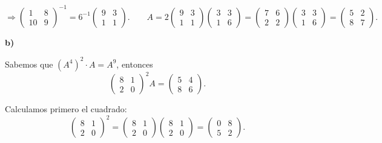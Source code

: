 \documentclass[a4paper,12pt]{article}
\begin{document}
\begin{ejercicio}[title=Ejercicio 22]
\[\Rightarrow
\begin{pmatrix}1 & 8\\ 10 & 9\end{pmatrix}^{-1} = 6^{-1} 
\begin{pmatrix}9 & 3\\ 1 & 1\end{pmatrix}.
\qquad
A = 2 
\begin{pmatrix}9 & 3\\ 1 & 1\end{pmatrix}
\begin{pmatrix}3 & 3\\ 1 & 6\end{pmatrix}
=
\begin{pmatrix}7 & 6\\ 2 & 2\end{pmatrix}
\begin{pmatrix}3 & 3\\ 1 & 6\end{pmatrix}
=
\boxed{ 
\begin{pmatrix}5 & 2\\ 8 & 7\end{pmatrix}}.
\]

\vspace{0.5em}

\textbf{b)}

Sabemos que $(A^4)^2 \cdot A = A^9$, entonces
\[
\begin{pmatrix}8 & 1\\ 2 & 0\end{pmatrix}^2 A = \begin{pmatrix}5 & 4\\ 8 & 6\end{pmatrix}.
\]

Calculamos primero el cuadrado:
\[
\begin{pmatrix}8 & 1\\ 2 & 0\end{pmatrix}^2 = 
\begin{pmatrix}8 & 1\\ 2 & 0\end{pmatrix} 
\begin{pmatrix}8 & 1\\ 2 & 0\end{pmatrix} =
\begin{pmatrix}0 & 8\\ 5 & 2\end{pmatrix}.
\]


\end{ejercicio}
\end{document}
